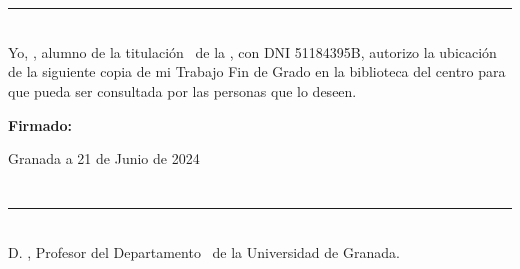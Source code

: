 
\chapter*{}

\thispagestyle{empty}

\noindent\rule[-2ex]{\textwidth}{1.5pt}\\[3.5ex]

Yo, \textbf{\myName}, alumno de la titulación \myDegree\ de la \textbf{\myFaculty}, con DNI 51184395B, autorizo la
ubicación de la siguiente copia de mi Trabajo Fin de Grado en la biblioteca del centro para que pueda ser
consultada por las personas que lo deseen.

\vspace{6cm}

\noindent \textbf{Firmado:} \myName

\vspace{2cm}

\begin{flushright}
    Granada a 21 de Junio de 2024
\end{flushright}


\chapter*{}

\thispagestyle{empty}

\noindent\rule[-2ex]{\textwidth}{1.5pt}\\[3.5ex]

D. \textbf{\myProf}, Profesor del Departamento \myDepartmentAlt\ de la Universidad de Granada.

\vspace{0.5cm}



